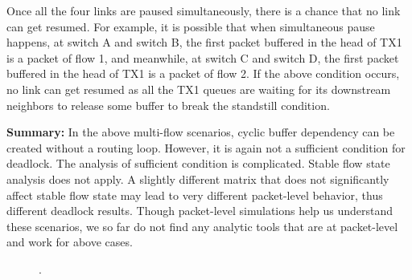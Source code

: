 Once all the four links are paused simultaneously, there is a chance that no link can get resumed. 
For example, it is possible that when simultaneous pause happens, at switch A and switch B, the 
first packet buffered in the head of TX1 is a packet of flow 1, and meanwhile, at switch C and switch 
D, the first packet buffered in the head of TX1 is a packet of flow 2. If the above condition occurs, 
no link can get resumed as all the TX1 queues are waiting for its downstream neighbors to release some 
buffer to break the standstill condition.

\textbf{Summary:} 
In the above multi-flow scenarios, cyclic buffer dependency can be created without 
a routing loop. However, it is again not a sufficient condition for deadlock. The analysis of sufficient
condition is complicated. Stable flow state analysis does not apply.
A slightly different matrix that does not significantly affect stable flow state may lead
to very different packet-level behavior, thus different deadlock results. 
Though packet-level simulations help us understand these scenarios, we so far do not find
any analytic tools that are at packet-level and work for above cases.


\begin{figure}[t]
\centering


\caption{.}
\label{fig:case3}
\end{figure}

